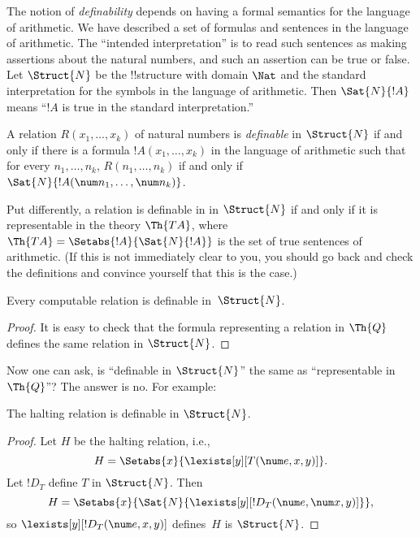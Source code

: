 \documentclass[../../include/open-logic-section]{subfiles}
\begin{document}


The notion of {\em definability} depends on having a formal semantics
for the language of arithmetic.  We have described a set of formulas
and sentences in the language of arithmetic. The ``intended
interpretation'' is to read such sentences as making assertions about
the natural numbers, and such an assertion can be true or false. Let
$\Struct{N}$ be the !!{structure} with domain $\Nat$ and the standard
interpretation for the symbols in the language of arithmetic.  Then
$\Sat{N}{!A}$ means ``$!A$ is true in the standard interpretation.''

\begin{defn}
  A relation $R(x_1,\dots,x_k)$ of natural numbers is {\em definable}
  in $\Struct{N}$ if and only if there is a formula $!A(x_1,\dots,x_k)$
  in the language of arithmetic such that for every $n_1,\dots,n_k$,
  $R(n_1,\dots,n_k)$ if and only if $\Sat{N}{!A(\num
  n_1,\dots,\num n_k)}$.
\end{defn}
Put differently, a relation is definable in in $\Struct{N}$ if and
only if it is representable in the theory $\Th{TA}$, where $\Th{TA} =
\Setabs{!A}{\Sat{N}{!A}}$ is the set of true sentences of
arithmetic. (If this is not immediately clear to you, you should go
back and check the definitions and convince yourself that this is the
case.)

\begin{lem}
Every computable relation is definable in~$\Struct{N}$.
\end{lem}

\begin{proof}
It is easy to check that the formula representing a relation in
$\Th{Q}$ defines the same relation in $\Struct{N}$. 
\end{proof}

Now one can ask, is ``definable in $\Struct{N}$'' the same as
``representable in $\Th{Q}$''? The answer is no. For example:

\begin{lem}
The halting relation is definable in $\Struct{N}$.
\end{lem}

\begin{proof}
Let $H$ be the halting relation, i.e.,
\[
H = \Setabs{x}{\lexists[y][T(\num e, x, y)]}.
\]
Let $!D_T$ define $T$ in $\Struct{N}$. Then
\[
H = \Setabs{x}{\Sat{N}{\lexists[y][!D_T(\num e, \num x, y)]}},
\]
so $\lexists[y][!D_T(\num e, x, y)]$ defines~$H$ is $\Struct{N}$. 
\end{proof}
\end{document}
